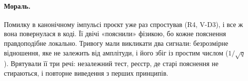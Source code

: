 \paragraph{Мораль.} Помилку в канонічному імпульсі проєкт уже раз спростував (R4, V-D3), і все ж
вона повернулася в коді. Її двічі «пояснили» фізикою, бо кожне пояснення правдоподібне локально.
Тривогу мали викликати два сигнали: безрозмірне відношення, яке не залежить від амплітуди, і його
збіг із простим числом ($1/\sqrt q$). Врятували її три речі: незалежний тест, реєстр, де старі
пояснення не стираються, і повторне виведення з перших принципів.
